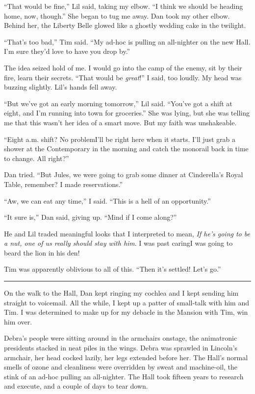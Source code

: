 “That would be fine,” Lil said, taking my elbow. “I think we should
be heading home, now, though.” She began to tug me away. Dan took
my other elbow. Behind her, the Liberty Belle glowed like a ghostly
wedding cake in the twilight.

“That's too bad,” Tim said. “My ad-hoc is pulling an all-nighter on
the new Hall. I'm sure they'd love to have you drop by.”

The idea seized hold of me. I would go into the camp of the enemy,
sit by their fire, learn their secrets. “That would be
\emph{great}!” I said, too loudly. My head was buzzing slightly.
Lil's hands fell away.

“But we've got an early morning tomorrow,” Lil said. “You've got a
shift at eight, and I'm running into town for groceries.” She was
lying, but she was telling me that this wasn't her idea of a smart
move. But my faith was unshakeable.

“Eight a.m. shift? No problem{\dash}I'll be right here when it starts.
I'll just grab a shower at the Contemporary in the morning and
catch the monorail back in time to change. All right?”

Dan tried. “But Jules, we were going to grab some dinner at
Cinderella's Royal Table, remember? I made reservations.”

“Aw, we can eat any time,” I said. “This is a hell of an
opportunity.”

“It sure is,” Dan said, giving up. “Mind if I come along?”

He and Lil traded meaningful looks that I interpreted to mean,
\emph{If he's going to be a nut, one of us really should stay with him}.
I was past caring{\dash}I was going to beard the lion in his den!

Tim was apparently oblivious to all of this. “Then it's settled!
Let's go.”

\begin{center}\rule{3in}{0.4pt}\end{center}

On the walk to the Hall, Dan kept ringing my cochlea and I kept
sending him straight to voicemail. All the while, I kept up a
patter of small-talk with him and Tim. I was determined to make up
for my debacle in the Mansion with Tim, win him over.

Debra's people were sitting around in the armchairs onstage, the
animatronic presidents stacked in neat piles in the wings. Debra
was sprawled in Lincoln's armchair, her head cocked lazily, her
legs extended before her. The Hall's normal smells of ozone and
cleanliness were overridden by sweat and machine-oil, the stink of
an ad-hoc pulling an all-nighter. The Hall took fifteen years to
research and execute, and a couple of days to tear down.

